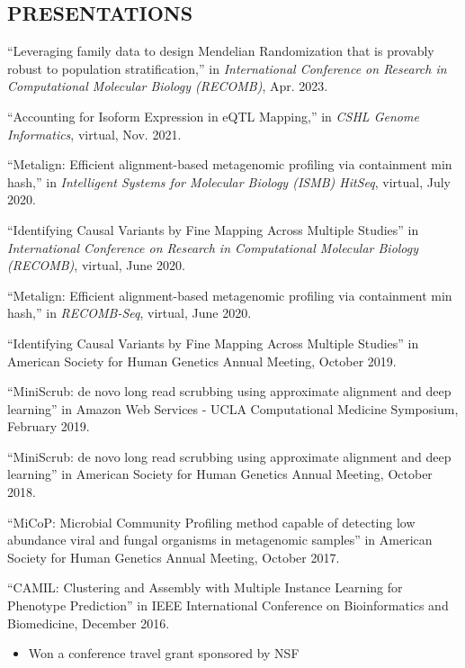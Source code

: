 \documentclass[margin, 10pt]{res} %
\begin{document}
\begin{resume}

\section{PRESENTATIONS}

``Leveraging family data to design Mendelian Randomization that is provably robust to population stratification,'' in {\sl International Conference on Research in Computational Molecular Biology (RECOMB)}, Apr. 2023.

``Accounting for Isoform Expression in eQTL Mapping,'' in {\sl CSHL Genome Informatics}, virtual, Nov. 2021.

``Metalign: Efficient alignment-based metagenomic profiling via containment min hash,'' in {\sl Intelligent Systems for Molecular Biology (ISMB) HitSeq}, virtual, July 2020.

``Identifying Causal Variants by Fine Mapping Across Multiple Studies'' in {\sl International Conference on Research in Computational Molecular Biology (RECOMB)}, virtual, June 2020.

``Metalign: Efficient alignment-based metagenomic profiling via containment min hash,'' in {\sl RECOMB-Seq}, virtual, June 2020.

``Identifying Causal Variants by Fine Mapping Across Multiple Studies'' in American Society for Human Genetics Annual Meeting, October 2019.

``MiniScrub: de novo long read scrubbing using approximate alignment and deep learning'' in Amazon Web Services - UCLA Computational Medicine Symposium, February 2019.

``MiniScrub: de novo long read scrubbing using approximate alignment and deep learning'' in American Society for Human Genetics Annual Meeting, October 2018.

``MiCoP: Microbial Community Profiling method capable of detecting low abundance viral and fungal organisms in metagenomic samples'' in American Society for Human Genetics Annual Meeting, October 2017.

``CAMIL: Clustering and Assembly with Multiple Instance Learning for Phenotype Prediction'' in IEEE International Conference on Bioinformatics and Biomedicine, December 2016.
\begin{itemize} \itemsep -2pt %
\item Won a conference travel grant sponsored by NSF
\end{itemize}


\end{resume}
\end{document}
